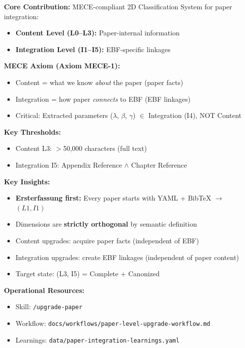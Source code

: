 \begin{tcolorbox}[colback=gray!5!white, colframe=gray!75!black,
    title=Appendix BM Summary: METHOD-PAPERINT (MECE-Compliant)]

\textbf{Core Contribution:}
MECE-compliant 2D Classification System for paper integration:
\begin{itemize}[nosep]
    \item \textbf{Content Level (L0--L3):} Paper-internal information
    \item \textbf{Integration Level (I1--I5):} EBF-specific linkages
\end{itemize}

\textbf{MECE Axiom (Axiom MECE-1):}
\begin{itemize}[nosep]
    \item Content = what we know \textit{about} the paper (paper facts)
    \item Integration = how paper \textit{connects} to EBF (EBF linkages)
    \item Critical: Extracted parameters ($\lambda$, $\beta$, $\gamma$) $\in$ Integration (I4), NOT Content
\end{itemize}

\textbf{Key Thresholds:}
\begin{itemize}[nosep]
    \item Content L3: $>$50,000 characters (full text)
    \item Integration I5: Appendix Reference $\land$ Chapter Reference
\end{itemize}

\textbf{Key Insights:}
\begin{itemize}[nosep]
    \item \textbf{Ersterfassung first:} Every paper starts with YAML + BibTeX $\rightarrow$ $(L1, I1)$
    \item Dimensions are \textbf{strictly orthogonal} by semantic definition
    \item Content upgrades: acquire paper facts (independent of EBF)
    \item Integration upgrades: create EBF linkages (independent of paper content)
    \item Target state: (L3, I5) = Complete + Canonized
\end{itemize}

\textbf{Operational Resources:}
\begin{itemize}[nosep]
    \item Skill: \texttt{/upgrade-paper}
    \item Workflow: \texttt{docs/workflows/paper-level-upgrade-workflow.md}
    \item Learnings: \texttt{data/paper-integration-learnings.yaml}
\end{itemize}

\end{tcolorbox}

